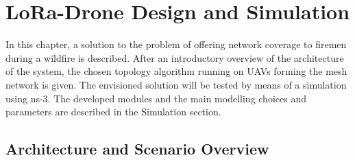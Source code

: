 
\chapter{LoRa-Drone Design and Simulation}
\label{chapter:loradronesim}

In this chapter, a solution to the problem of offering network coverage to firemen during a wildfire is described. After an introductory overview of the architecture of the system, the chosen topology algorithm running on \glspl{UAV} forming the mesh network is given. The envisioned solution will be tested by means of a simulation using ns-3. The developed modules and the main modelling choices and parameters are described in the Simulation section. 

\section{Architecture and Scenario Overview}

